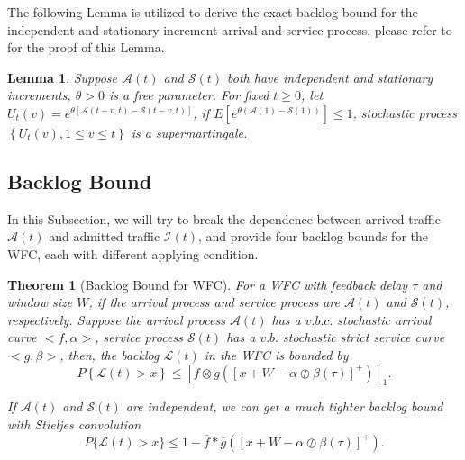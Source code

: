 \documentclass[paper]{ieice}
\newtheorem{theorem}{Theorem}
\newtheorem{lemma}{Lemma}
\begin{document}
The following Lemma is utilized to derive the exact backlog bound for the independent and stationary increment arrival and service process, please refer to \cite{jiang2009network,Ciucu2007Network} for the proof of this Lemma.
\begin{lemma}\label{lamma5}
Suppose $\mathcal{A}(t)$ and $\mathcal{S}(t)$ both have independent and stationary increments, $\theta>0$ is a free parameter. For fixed $t\geq 0$, let $U_{t}(v)=e^{\theta[\mathcal{A}(t-v,t)-\mathcal{S}(t-v,t)]}$, if $E[e^{\theta (\mathcal{A}(1)-\mathcal{S}(1))}]\leq 1$, stochastic process $\left\{U_{t}(v),1\leq v\leq t\right\}$ is a supermartingale.
\end{lemma}

\subsection{Backlog Bound}\label{backlog}
In this Subsection, we will try to break the dependence between arrived traffic $\mathcal{A}(t)$ and admitted traffic $\mathcal{I}(t)$, and provide four backlog bounds for the WFC, each with different applying condition.
\begin{theorem}[Backlog Bound for WFC]\label{theorem1}
For a WFC with feedback delay $\tau$ and window size $W$, if the arrival process and service process are $\mathcal{A}(t)$ and $\mathcal{S}(t)$, respectively. Suppose the arrival process $\mathcal{A}(t)$ has a $v.b.c.$ stochastic arrival curve $<f,\alpha>$, service process $\mathcal{S}(t)$ has a $v.b.$ stochastic strict service curve $<g,\beta>$, then, the backlog $\mathcal{L}(t)$ in the WFC is bounded by
\begin{equation}\label{eqn1}
P\left\{\mathcal{L}(t)>x\right\}\leq [f\otimes g([x+W-\alpha\oslash\beta(\tau)]^+)]_1.
\end{equation}

If $\mathcal{A}(t)$ and $\mathcal{S}(t)$ are independent, we can get a much tighter backlog bound with Stieljes convolution
\begin{equation}\label{eqn2}
P\{\mathcal{L}(t)>x\}\leq 1-\bar{f}\ast\bar{g}([x+W-\alpha\oslash\beta(\tau)]^+).
\end{equation}
\end{theorem}
\end{document}
